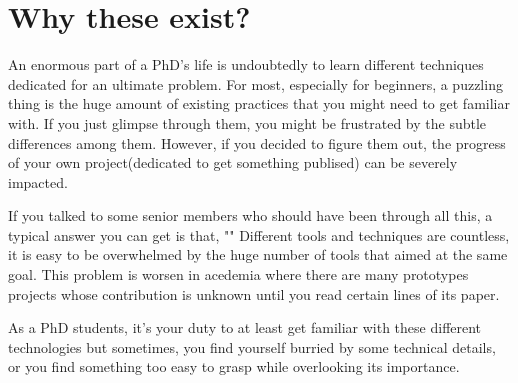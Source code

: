 \section{Why these exist?}
An enormous part of a PhD's life is undoubtedly to learn different techniques dedicated for an ultimate problem.
For most, especially for beginners, a puzzling thing is the huge amount of existing practices that you might need to get familiar with.
If you just glimpse through them, you might be frustrated by the subtle differences among them.
However, if you decided to figure them out, the progress of your own project(dedicated to get something publised) can be severely impacted.

If you talked to some senior members who should have been through all this, a typical answer you can get is that, ""
Different tools and techniques are countless, it is easy to be overwhelmed by the huge number of tools that aimed at the same goal.
This problem is worsen in acedemia where there are many prototypes projects whose contribution is unknown until you read certain lines of its paper.

As a PhD students, it's your duty to at least get familiar with these different technologies but sometimes, you find yourself burried by some 
technical details, or you find something too easy to grasp while overlooking its importance.

